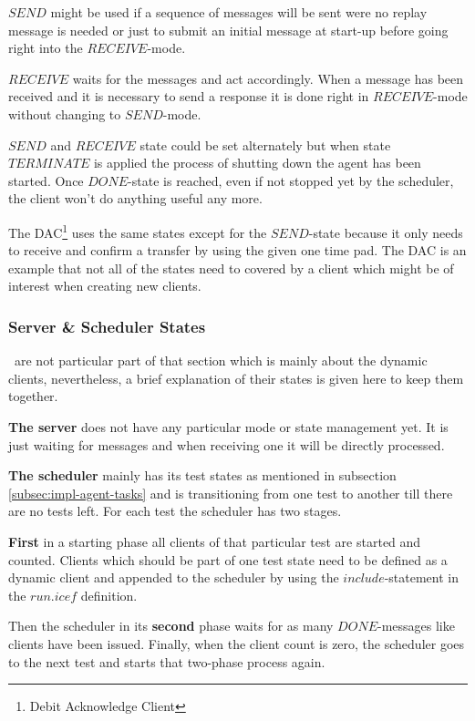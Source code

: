 $SEND$ might be used if a sequence of messages will be sent were no replay message is needed or just to submit an initial message at start-up before going right into the $RECEIVE$-mode.

$RECEIVE$ waits for the messages and act accordingly. When a message has been received and it is necessary to send a response it is done right in $RECEIVE$-mode without changing to $SEND$-mode.

$SEND$ and $RECEIVE$ state could be set alternately but when state $TERMINATE$ is applied the process of shutting down the agent has been started. Once $DONE$-state is reached, even if not stopped yet by the scheduler, the client won't do anything useful any more.

The DAC\footnote{Debit Acknowledge Client} uses the same states except for the $SEND$-state because it only needs to receive and confirm a transfer by using the given one time pad. The DAC is an example that not all of the states need to covered by a client which might be of interest when creating new clients.

\subsubsection{Server \& Scheduler States}\ are not particular part of that section which is mainly about the dynamic clients, nevertheless, a brief explanation of their states is given here to keep them together.

\textbf{The server} does not have any particular mode or state management yet. It is just waiting for messages and when receiving one it will be directly processed.

\textbf{The scheduler} mainly has its test states as mentioned in  subsection \ref{subsec:impl-agent-tasks} and is transitioning from one test to another till there are no tests left. For each test the scheduler has two stages.

\textbf{First} in a starting phase all clients of that particular test are started and counted. Clients which should be part of one test state need to be defined as a dynamic client and appended to the scheduler by using the $include$-statement in the $run.icef$ definition.

Then the scheduler in its \textbf{second} phase waits for as many $DONE$-messages like clients have been issued. Finally, when the client count is zero, the scheduler goes to the next test and starts that two-phase process again.

